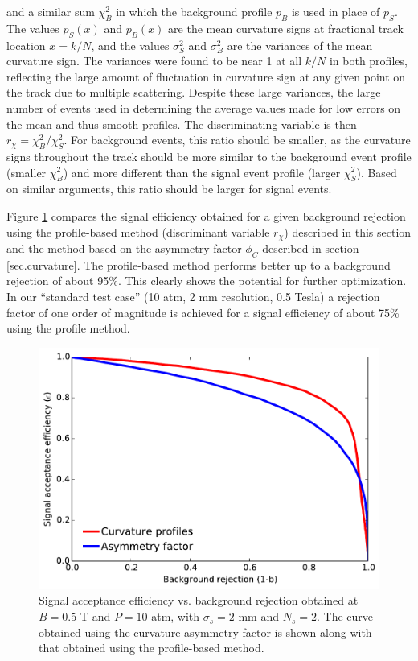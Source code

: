 \documentclass{JINST}
\begin{document}
\noindent and a similar sum $\chi^2_B$ in which the background profile $p_{B}$ is used in place of $p_{S}$.  The values $p_S(x)$ and $p_B(x)$ are the mean curvature signs at fractional track location $x = k/N$, and the values $\sigma^2_S$ and $\sigma^2_B$ are the variances of the mean curvature sign.  The variances were found to be near 1 at all $k/N$ in both profiles, reflecting the large amount of fluctuation in curvature sign at any given point on the track due to multiple scattering.  Despite these large variances, the large number of events used in determining the average values made for low errors on the mean and thus smooth profiles.  The discriminating variable is then $r_{\chi} = \chi^2_B/\chi^2_{S}$.  For background events, this ratio should be smaller, as the curvature signs throughout the track should be more similar to the background event profile (smaller $\chi^2_B$) and more different than the signal event profile (larger $\chi^2_S$).  Based on similar arguments, this ratio should be larger for signal events.

Figure \ref{fig_svsbprof} compares the signal efficiency obtained for a given background rejection using the profile-based method (discriminant variable $r_{\chi}$) described in this section and the method based on the asymmetry factor $\phi_{C}$ described in section \ref{sec.curvature}.  The profile-based method performs better up to a background rejection of about 95\%.  This clearly shows the potential for further optimization. In our ``standard test case'' (10 atm, 2 mm resolution, 0.5 Tesla) a rejection factor of one order of magnitude is achieved for a signal efficiency of about 75\% using the profile method. 

\begin{figure}[!htb]
	\centering
	\includegraphics[scale=0.55]{fig/sigvsb_prof_vs_asymm.pdf}
	\caption{\label{fig_svsbprof}Signal acceptance efficiency vs. background rejection obtained at $B = 0.5$ T and $P = 10$ atm, with $\sigma_{s} = 2$ mm and $N_{s} = 2$.  The curve obtained using the curvature asymmetry factor is shown along with that obtained using the profile-based method.}
\end{figure}
\end{document}

